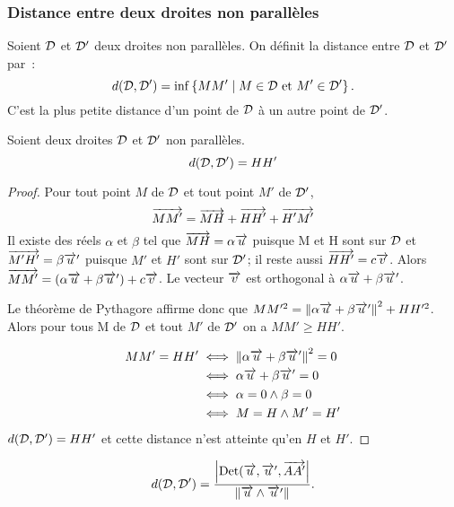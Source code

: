 \subsubsection{Distance entre deux droites non parallèles}

\begin{defdef}
  Soient \(\mathcal{D}\) et \(\mathcal{D}'\) deux droites non parallèles. On définit la distance entre \(\mathcal{D}\) et \(\mathcal{D}'\) par~:
  \begin{equation}
    d(\mathcal{D},\mathcal{D}')=\inf\left\{MM'\mathrel{}\middle|\mathrel{}M \in \mathcal{D} \text{~et~} M'\in \mathcal{D}'\right\}.
  \end{equation}
C'est la plus petite distance d'un point de \(\mathcal{D}\) à un autre point de \(\mathcal{D}'\).
\end{defdef}
\begin{prop}
  Soient deux droites \(\mathcal{D}\) et \(\mathcal{D}'\) non parallèles.
  \begin{equation}
    d(\mathcal{D},\mathcal{D}')=HH'
  \end{equation}
\end{prop}
\begin{proof}
  Pour tout point \(M\) de \(\mathcal{D}\) et tout point \(M'\) de \(\mathcal{D}'\), 
  \begin{equation}
    \overrightarrow{MM'}=\overrightarrow{MH}+\overrightarrow{HH'}+\overrightarrow{H'M'}
  \end{equation}
Il existe des réels \(\alpha\) et \(\beta\) tel que \(\overrightarrow{MH}=\alpha\overrightarrow{u}\) puisque M et H sont sur \(\mathcal{D}\) et \(\overrightarrow{M'H'}=\beta\overrightarrow{u}'\) puisque \(M'\) et \(H'\) sont sur \(\mathcal{D}'\); il reste aussi \(\overrightarrow{HH'}=c\overrightarrow{v}\). Alors \(\overrightarrow{MM'}=(\alpha\overrightarrow{u}+\beta\overrightarrow{u}')+c\overrightarrow{v}\). Le vecteur \(\overrightarrow{v}\) est orthogonal à \(\alpha\overrightarrow{u}+\beta\overrightarrow{u}'\).

Le théorème de Pythagore affirme donc que \(MM'^2=\left\lVert\alpha\overrightarrow{u}+\beta\overrightarrow{u}'\right\rVert^2+HH'^2\). Alors pour tous M de \(\mathcal{D}\) et tout \(M'\) de \(\mathcal{D}'\) on a \(MM'\geqslant HH'\).

\begin{align}
  MM'=HH' &\iff \left\lVert\alpha\overrightarrow{u}+\beta\overrightarrow{u}'\right\rVert^2=0\\
&\iff \alpha\overrightarrow{u}+\beta\overrightarrow{u}'=0\\
&\iff \alpha=0 \wedge \beta=0\\
&\iff M=H \wedge M'=H'
\end{align}
\(d(\mathcal{D},\mathcal{D}')=HH'\) et cette distance n'est atteinte qu'en \(H\) et \(H'\).
\end{proof}
\begin{prop}
  \begin{equation}
    d(\mathcal{D},\mathcal{D}')=\frac{\left\lvert\operatorname{Det}(\overrightarrow{u},\overrightarrow{u}',\overrightarrow{AA'}\right\rvert}{\left\lVert\overrightarrow{u}\wedge\overrightarrow{u}'\right\rVert}.
  \end{equation}
\end{prop}
